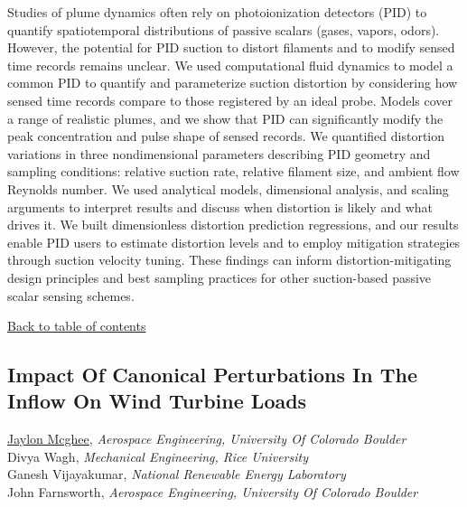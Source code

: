 \noindent Studies of plume dynamics often rely on photoionization detectors (PID) to quantify spatiotemporal distributions of passive scalars (gases, vapors, odors). However, the potential for PID suction to distort filaments and to modify sensed time records remains unclear. We used computational fluid dynamics to model a common PID to quantify and parameterize suction distortion by considering how sensed time records compare to those registered by an ideal probe. Models cover a range of realistic plumes, and we show that PID can significantly modify the peak concentration and pulse shape of sensed records. We quantified distortion variations in three nondimensional parameters describing PID geometry and sampling conditions: relative suction rate, relative filament size, and ambient flow Reynolds number. We used analytical models, dimensional analysis, and scaling arguments to interpret results and discuss when distortion is likely and what drives it. We built dimensionless distortion prediction regressions, and our results enable PID users to estimate distortion levels and to employ mitigation strategies through suction velocity tuning. These findings can inform distortion-mitigating design principles and best sampling practices for other suction-based passive scalar sensing schemes. \\ 
\begin{flushright}\vspace{-0.2 in}\hyperlink{toc}{Back to table of contents}\end{flushright}\vspace{-0.2 in}
\hypertarget{JaylonMcghee}{\subsection*{\color{CUGOLD} Impact Of Canonical Perturbations In The Inflow On Wind Turbine Loads}} \vsp 
\underline{Jaylon Mcghee}, \textit{Aerospace Engineering, University Of Colorado Boulder}\\ 
{Divya Wagh}, \textit{Mechanical Engineering, Rice University}\\ 
{Ganesh Vijayakumar}, \textit{National Renewable Energy Laboratory}\\ 
{John Farnsworth}, \textit{Aerospace Engineering, University Of Colorado Boulder}\\ 
\vspace{-0.1 in} \\ 
